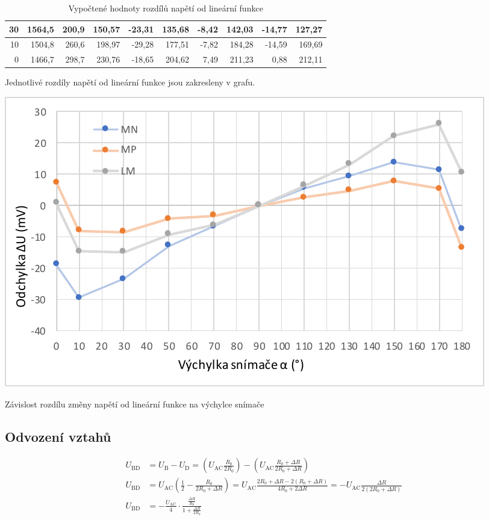 \documentclass[a4paper,12pt]{article}   %
\begin{document}
\begin{table}[]
\begin{tabular}{|r|r|r||r|r||r|r||r|r||r|}
  30                       & 1564,5       & 200,9              & 150,57               & -23,31                    & 135,68               & -8,42                     & 142,03              & -14,77                    & 127,27     \\\hline
  10                       & 1504,8       & 260,6              & 198,97               & -29,28                    & 177,51               & -7,82                     & 184,28              & -14,59                    & 169,69     \\\hline
  0                        & 1466,7       & 298,7              & 230,76               & -18,65                    & 204,62               & 7,49                      & 211,23              & 0,88                      & 212,11    \\\hline
  \end{tabular}
  \caption{Vypočtené hodnoty rozdílů napětí od lineární funkce}
  \label{tab:master}
\end{table}

Jednotlivé rozdíly napětí od lineární funkce jsou zakresleny v grafu.
\begin{graf}
  \centering
  \includegraphics[width=\textwidth]{graf1.pdf}
  \caption{Závislost rozdílu změny napětí od lineární funkce na výchylce snímače}
  \label{gr:delta}
\end{graf}

\subsection{Odvození vztahů}
\begin{equation}
  \begin{split}
    U_\text{BD} &= U_\text{B} - U_\text{D} = \left(U_\text{AC}\frac{R_0}{2R_0}\right)-\left(U_\text{AC}\frac{R_0+\Delta R}{2R_0+\Delta R}\right)\\
    U_\text{BD} &= U_\text{AC}\left(\frac{1}{2}-\frac{R_0}{2R_0+\Delta R}\right) = U_\text{AC}\frac{2R_0+\Delta R -2(R_0+\Delta R)}{4R_0 + 2\Delta R} = -U_\text{AC}\frac{\Delta R}{2(2R_0+\Delta R)}\\
    U_\text{BD} &= -\frac{U_\text{AC}}{4}\cdot\frac{\frac{\Delta R}{R_0}}{1+\frac{\Delta R}{2R_0}}\\
  \end{split}
\end{equation}
\end{document}
